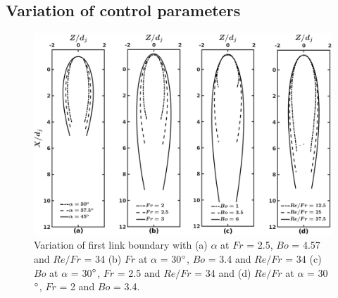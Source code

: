 \subsection{Variation of control parameters}
\begin{figure}[t]
    \centering
    \includegraphics[width=\linewidth]{chapters/jetJet/finalContour}
    \caption{Variation of first link boundary with (a) $\alpha$ at $Fr$ = 2.5, $Bo$ = 4.57 and $Re/Fr$ = 34 (b) $Fr$ at $\alpha$ = 30$\degree$, $Bo$ = 3.4 and $Re/Fr$ = 34 (c) $Bo$ at $\alpha$ = 30$\degree$, $Fr$ = 2.5 and $Re/Fr$ = 34 and (d) $Re/Fr$ at $\alpha$ = 30$\degree$, $Fr$ = 2 and $Bo$ = 3.4.}
    \label{Figure::phaseContoursLink1}
\end{figure}
